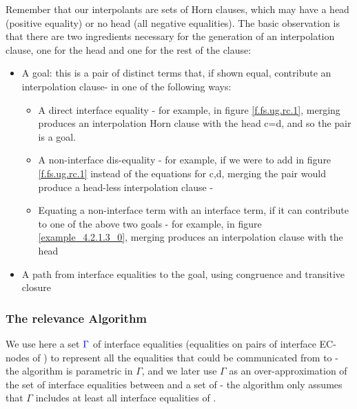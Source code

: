 Remember that our interpolants are sets of Horn clauses, which may have a head (positive equality) or no head (all negative equalities).
The basic observation is that there are two ingredients necessary for the generation of an interpolation clause, one for the head and one for the rest of the clause:
\begin{itemize}
	\item A goal: this is a pair of distinct terms that, if shown equal, contribute an interpolation clause- in one of the following ways:
		\begin{itemize}
			\item A direct interface equality - for example, in figure \ref{f.fs.ug.rc.1}, merging  produces an interpolation Horn clause with the head c=d, and so the pair  is a goal.
			\item A non-interface dis-equality - for example, if we were to add \m{\textcolor{red}{z_0}\neq\textcolor{red}{z_1}} in figure \ref{f.fs.ug.rc.1} instead of the equations for c,d, merging the pair  would produce a head-less interpolation clause - 
			\item Equating a non-interface term with an interface term, if it can contribute to one of the above two goals - for example, in figure \ref{example_4.2.1.3_0}, merging  produces an interpolation clause with the head\\ 
		\end{itemize}
	\item A path from interface equalities to the goal, using congruence and transitive closure
\end{itemize}

\subsubsection*{The relevance Algorithm}
We use here a set $\textcolor{blue}{\Gamma}$ of interface equalities (equalities on pairs of interface EC-nodes of ) to represent all the equalities that could be communicated from  to  - 
the algorithm is parametric in $\Gamma$, and we later use $\Gamma$ as an over-approximation of the set of interface equalities between  and a set of  - the algorithm only assumes that $\Gamma$ includes at least all interface equalities of .

